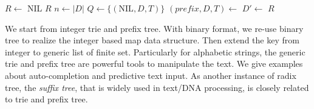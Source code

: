 \documentclass[b5paper]{article}
\begin{document}
\begin{algorithmic}[1]
  \State $R \gets $ NIL
    \State \Return $R$
  \EndIf
  \State $n \gets |D|$
  \State $Q \gets \{(\text{NIL}, D, T)\}$
    \State $(\textit{prefix}, D, T) \gets$ 
      \State $D' \gets$ 
       
        \State {} 
        \State {}
      \EndIf
    \EndFor
  \EndWhile
  \State \Return $R$
\EndFunction
\end{algorithmic}

We start from integer trie and prefix tree. With binary format, we re-use binary tree to realize the integer based map data structure. Then extend the key from integer to generic list of finite set. Particularly for alphabetic strings, the generic trie and prefix tree are powerful tools to manipulate the text. We give examples about auto-completion and predictive text input. As another instance of radix tree, the {\em suffix tree}, that is widely used in text/DNA processing, is closely related to trie and prefix tree.

\begin{Exercise}[label={ex:prefix-tree-app}]
\end{Exercise}
\end{document}
